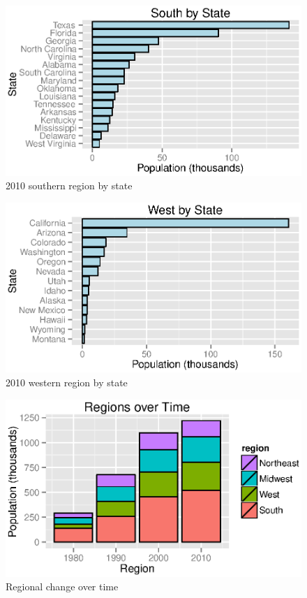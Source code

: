 \documentclass{exam}
\begin{document}
  \begin{figure}[H]
    \centering
    \includegraphics[scale = 0.9]{figures/south_by_state.eps}
    \caption{2010 southern region by state}
  \end{figure}

  \begin{figure}[H]
    \centering
    \includegraphics[scale = 0.9]{figures/west_by_state.eps}
    \caption{2010 western region by state}
  \end{figure}

  \begin{figure}[H]
    \centering
    \includegraphics[scale = 0.9]{figures/regions_over_time.eps}
    \caption{Regional change over time}
  \end{figure}
\end{document}
